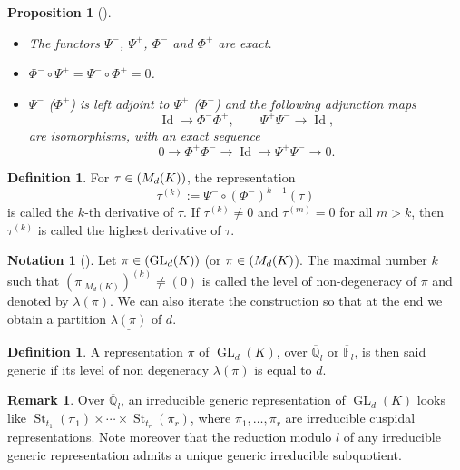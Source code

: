 \documentclass[JEP,XML,SOM,Unicode,published]{cedram}
\newcommand{\NoChangel}[1]{%
\expandafter\let\csname old\string#1\endcsname=#1
\let#1=\relax
\newcommand{#1}{\mathcode`l="716C\csname old\string#1\endcsname\mathcode`l="7160 }%
}
\DeclareMathOperator{\GL}{GL}
\theoremstyle{plain}
\newtheorem{prop}[equation]{Proposition}
\theoremstyle{definition}
\newtheorem{defin}[equation]{Definition}
\newtheorem*{remark}{Remark}
\newtheorem{nota}[equation]{Notation}
\numberwithin{equation}{subsection}
\newcommand\Fm{{\mathbb F}}
\newcommand\Qm{{\mathbb Q}}
\DeclareMathOperator{\Id}{Id}
\DeclareMathOperator{\st}{St}
\DeclareMathOperator{\alg}{Alg}\NoChangel{\alg}
\begin{document}
\skpt
\begin{prop}[{\cite[p.\,451]{zelevinski1}}]
\begin{itemize}
\item The functors $\Psi^-$, $\Psi^+$, $\Phi^-$ and $\Phi^+$ are exact.

\item $\Phi^- \circ \Psi^+=\Psi^- \circ \Phi^+=0$.

\item $\Psi^-$ (\resp $\Phi^+$) is left adjoint to $\Psi^+$ (\resp $\Phi^-$) and the
following adjunction maps
\[
\Id \to \Phi^- \Phi^+, \qquad \Psi^+ \Psi^- \to \Id,
\]
are isomorphisms, with an exact sequence
\[
0 \to \Phi^+ \Phi^- \to \Id \to \Psi^+ \Psi^-
\to 0.
\]
\end{itemize}
\end{prop}

\begin{defin}
For $\tau \in \alg(M_d(K))$, the representation
\[
\tau^{(k)}:=\Psi^- \circ (\Phi^-)^{k-1}(\tau)
\]
is called the $k$-th derivative of $\tau$. If $\tau^{(k)}\neq 0$ and $\tau^{(m)}=0$
for all $m > k$, then $\tau^{(k)}$ is called the highest derivative of $\tau$.
\end{defin}

\begin{nota}[{\cf \cite[4.3]{zelevinski2}}] \label{nota-nondegeneracy}
Let $\pi \in \alg(\GL_d(K))$ (or $\pi \in \alg(M_d(K)$). The maximal number $k$ such that
$(\pi_{|M_d(K)})^{(k)} \neq (0)$ is called the level of non-degeneracy of $\pi$ and
denoted by $\lambda(\pi)$. We can also iterate the construction so that at the end we obtain
a partition $\underline{\lambda(\pi)}$ of $d$.
\end{nota}

\begin{defin}
A representation $\pi$ of $\GL_d(K)$, over $\overline \Qm_l$ or $\overline \Fm_l$, is then said generic
if its level of non degeneracy $\lambda(\pi)$ is equal to $d$.
\end{defin}

\begin{remark}
Over $\overline \Qm_l$, an irreducible generic representation of
$\GL_d(K)$ looks like $\st_{t_1}(\pi_1) \times \cdots \times \st_{t_r}(\pi_r)$,
where $\pi_1,\dots, \pi_r$ are irreducible cuspidal representations. Note
moreover that the reduction modulo $l$ of any irreducible generic representation
admits a unique generic irreducible subquotient.
\end{remark}
\end{document}
